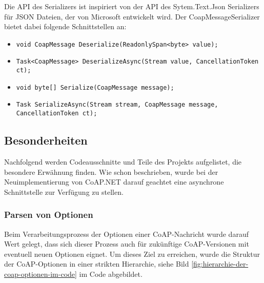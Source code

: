Die API des Serializers ist inspiriert von der API des Sytem.Text.Json Serializers für JSON Dateien, der von Microsoft entwickelt wird. Der CoapMessageSerializer bietet dabei folgende Schnittstellen an:
\begin{itemize}
    \item \texttt{void CoapMessage Deserialize(ReadonlySpan<byte> value);}
    \item \texttt{Task<CoapMessage> DeserializeAsync(Stream value, CancellationToken ct);}
    \item \texttt{void byte[] Serialize(CoapMessage message);}
    \item \texttt{Task SerializeAsync(Stream stream, CoapMessage message, CancellationToken ct);}
\end{itemize}

\subsection{Besonderheiten}
\label{subsec:besonderheiten}

Nachfolgend werden Codeausschnitte und Teile des Projekts aufgelistet, die besondere Erwähnung finden. Wie schon beschrieben, wurde bei der Neuimplementierung von CoAP.NET darauf geachtet eine asynchrone Schnittstelle zur Verfügung zu stellen.

\subsubsection{Parsen von Optionen}
\label{subsubsec:parsen-von-optionen}

Beim Verarbeitungsprozess der Optionen einer CoAP-Nachricht wurde darauf Wert gelegt, dass sich dieser Prozess auch für zukünftige CoAP-Versionen mit eventuell neuen Optionen eignet. Um dieses Ziel zu erreichen, wurde die Struktur der CoAP-Optionen in einer strikten Hierarchie, siehe Bild \ref{fig:hierarchie-der-coap-optionen-im-code} im Code abgebildet.


